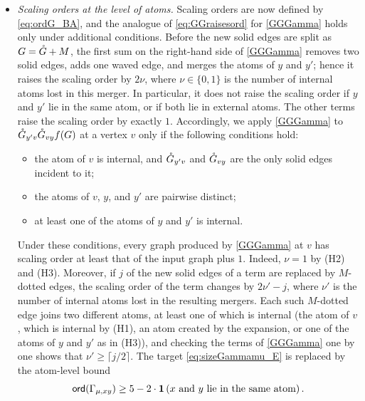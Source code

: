 \begin{itemize}
\item[(ii)] \emph{Scaling orders at the level of atoms.} Scaling orders are now defined by \eqref{eq:ordG_BA}, and the analogue of \eqref{eq:GGraisesord} for \eqref{GGGamma} holds only under additional conditions. Before the new solid edges are split as $G={\mathring G}+M$, the first sum on the right-hand side of \eqref{GGGamma} removes two solid edges, adds one waved edge, and merges the atoms of $y$ and $y'$; hence it raises the scaling order by $2\nu$, where $\nu\in\{0,1\}$ is the number of internal atoms lost in this merger. In particular, it does not raise the scaling order if $y$ and $y'$ lie in the same atom, or if both lie in external atoms. The other terms raise the scaling order by exactly $1$. Accordingly, we apply \eqref{GGGamma} to ${\mathring G}_{y'v}{\mathring G}_{vy}f(G)$ at a vertex $v$ only if the following conditions hold:
\begin{itemize}
\item[(H1)] the atom of $v$ is internal, and ${\mathring G}_{y'v}$ and ${\mathring G}_{vy}$ are the only solid edges incident to it;
\item[(H2)] the atoms of $v$, $y$, and $y'$ are pairwise distinct;
\item[(H3)] at least one of the atoms of $y$ and $y'$ is internal.
\end{itemize}
Under these conditions, every graph produced by \eqref{GGGamma} at $v$ has scaling order at least that of the input graph plus $1$. Indeed, $\nu=1$ by (H2) and (H3). Moreover, if $j$ of the new solid edges of a term are replaced by $M$-dotted edges, the scaling order of the term changes by $2\nu'-j$, where $\nu'$ is the number of internal atoms lost in the resulting mergers. Each such $M$-dotted edge joins two different atoms, at least one of which is internal (the atom of $v$, which is internal by (H1), an atom created by the expansion, or one of the atoms of $y$ and $y'$ as in (H3)), and checking the terms of \eqref{GGGamma} one by one shows that $\nu'\ge \lceil j/2\rceil$.
The target \eqref{eq:sizeGammamu_E} is replaced by the atom-level bound
\[ {\mathsf{ord}}(\Gamma_{\mu,xy})\ge 5-2\cdot\mathbf 1\left({x \text{ and } y \text{ lie in the same atom}}\right) . \]

\end{itemize}
